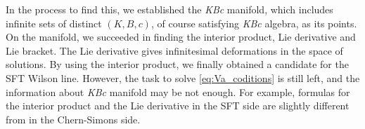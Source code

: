 \documentclass[12pt]{article}
\begin{document}
In the process to find this, we established the \textit{KBc} manifold, which includes infinite sets of distinct $(K,B,c)$, of course satisfying \textit{KBc} algebra, as its points.
On the manifold, we succeeded in finding the interior product, Lie derivative and Lie bracket.
The Lie derivative gives infinitesimal deformations in the space of solutions.
By using the interior product, we finally obtained a candidate for the SFT Wilson line.
However, the task to solve \eqref{eq:Va_coditions} is still left, and the information about \textit{KBc} manifold may be not enough.
For example, formulas for the interior product and the Lie derivative in the SFT side are slightly different from in the Chern-Simons side.

 

\end{document}
